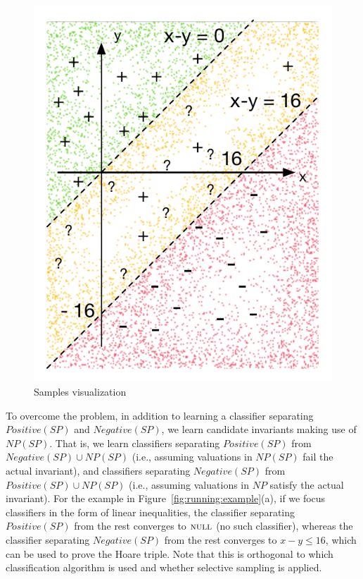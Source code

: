  \begin{figure}
	 \vspace{-8mm}
\centering
\includegraphics[scale=0.42]{figures/running-sampling.pdf}
 \caption{Samples visualization}
  \vspace{-6mm}
      \label{fig:running:example:sampling}
 \end{figure}

To overcome the problem, in addition to learning a classifier separating $Positive(SP)$ and $Negative(SP)$, we learn candidate invariants making use of $NP(SP)$. That is, we learn classifiers separating $Positive(SP)$ from $Negative(SP) \cup NP(SP)$ (i.e., assuming valuations in $NP(SP)$ fail the actual invariant), and classifiers separating $Negative(SP)$ from $Positive(SP) \cup NP(SP)$ (i.e., assuming valuations in $NP$ satisfy the actual invariant). For the example in Figure~\ref{fig:running:example}(a), if we focus classifiers in the form of linear inequalities, the classifier separating $Positive(SP)$ from the rest converges to $\textsc{null}$ (no such classifier), whereas the classifier separating $Negative(SP)$ from the rest converges to $x - y \leq 16$, which can be used to prove the Hoare triple. Note that this is orthogonal to which classification algorithm is used and whether selective sampling is applied.

%
